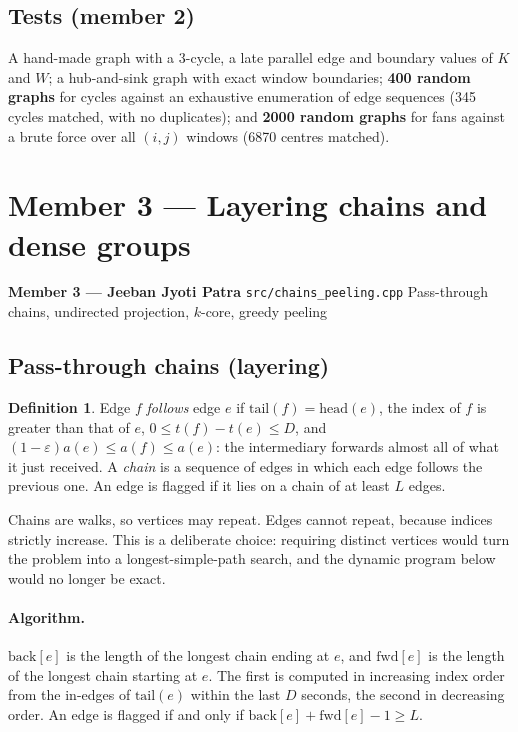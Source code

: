\documentclass[11pt,a4paper]{article}
\theoremstyle{definition}
\newtheorem{definition}{Definition}
\begin{document}
\subsection{Tests (member 2)}
A hand-made graph with a 3-cycle, a late parallel edge and boundary values of $K$ and $W$; a hub-and-sink graph with exact window boundaries; \textbf{400 random graphs} for cycles against an exhaustive enumeration of edge sequences (345 cycles matched, with no duplicates); and \textbf{2000 random graphs} for fans against a brute force over all $(i, j)$ windows (6870 centres matched).

\newpage
\section{Member 3 --- Layering chains and dense groups}

\begin{memberstrip}
\small\textbf{Member 3 --- Jeeban Jyoti Patra} \hfill \texttt{src/chains\_peeling.cpp} \quad Pass-through chains, undirected projection, $k$-core, greedy peeling
\end{memberstrip}

\subsection{Pass-through chains (layering)}
\begin{definition}
Edge $f$ \emph{follows} edge $e$ if $\text{tail}(f) = \text{head}(e)$, the index of $f$ is greater than that of $e$, $0 \le t(f) - t(e) \le D$, and $(1 - \varepsilon)a(e) \le a(f) \le a(e)$: the intermediary forwards almost all of what it just received. A \emph{chain} is a sequence of edges in which each edge follows the previous one. An edge is flagged if it lies on a chain of at least $L$ edges.
\end{definition}

Chains are walks, so vertices may repeat. Edges cannot repeat, because indices strictly increase. This is a deliberate choice: requiring distinct vertices would turn the problem into a longest-simple-path search, and the dynamic program below would no longer be exact.

\paragraph{Algorithm.} $\text{back}[e]$ is the length of the longest chain ending at $e$, and $\text{fwd}[e]$ is the length of the longest chain starting at $e$. The first is computed in increasing index order from the in-edges of $\text{tail}(e)$ within the last $D$ seconds, the second in decreasing order. An edge is flagged if and only if $\text{back}[e] + \text{fwd}[e] - 1 \ge L$.
\end{document}
